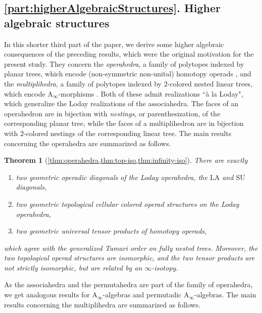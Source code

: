\documentclass{amsart}
\newtheorem*{theorem*}{Theorem}
\theoremstyle{definition}
\newcommand{\SU}{\mathrm{SU}}
\newcommand{\LA}{\mathrm{LA}}
\newcommand{\Ainf}{\ensuremath{\mathrm{A}_\infty}}
\begin{document}

\pagebreak
\subsection*{\cref{part:higherAlgebraicStructures}. Higher algebraic structures}

In this shorter third part of the paper, we derive some higher algebraic consequences of the preceding results, which were the original motivation for the present study.
They concern the \emph{operahedra}, a family of polytopes indexed by planar trees, which encode (non-symmetric non-unital) homotopy operads \cite{LaplanteAnfossi}, and the \emph{multiplihedra}, a family of polytopes indexed by $2$-colored nested linear trees, which encode $\Ainf$-morphisms \cite{LaplanteAnfossiMazuir}.
Both of these admit realizations ``\`a la Loday", which generalize the Loday realizations of the associahedra. 
The faces of an operahedron are in bijection with \emph{nestings}, or parenthesization, of the corresponding planar tree, while the faces of a multiplihedron are in bijection with $2$-colored nestings of the corresponding linear tree. 
The main results concerning the operahedra are summarized as follows. 

\begin{theorem*}[\cref{thm:operahedra,thm:top-iso,thm:infinity-iso}] 
There are exactly 
\begin{enumerate}
	\item two geometric operadic diagonals of the Loday operahedra, the $\LA$ and $\SU$ diagonals, 
	\item two geometric topological cellular colored operad structures on the Loday operahedra,
	\item two geometric universal tensor products of homotopy operads,
\end{enumerate}
which agree with the generalized Tamari order on fully nested trees. 
Moreover, the two topological operad structures are isomorphic, and the two tensor products are not strictly isomorphic, but are related by an $\infty$-isotopy. 
\end{theorem*}

As the associahedra and the permutahedra are part of the family of operahedra, we get analogous results for $\Ainf$-algebras and permutadic $\Ainf$-algebras. 
The main results concerning the multiplihedra are summarized as follows. 
\end{document}
